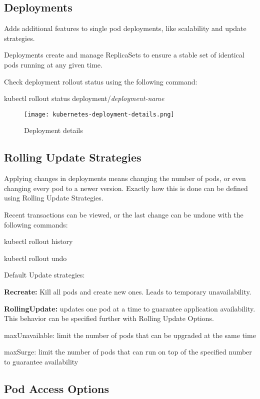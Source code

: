 \subsection{Deployments}
Adds additional features to single pod deployments, like scalability and update strategies. 

Deployments create and manage ReplicaSets to ensure a stable set of identical pods running at any given time. 

Check deployment rollout status using the following command:

\ttfamily
kubectl rollout status deployment/\emph{deployment-name}
\rmfamily

\begin{figure}[h]
    \centering
    \texttt{[image: kubernetes-deployment-details.png]}
    \caption{Deployment details}
\end{figure}

\subsection{Rolling Update Strategies}
Applying changes in deployments means changing the number of pods, or even changing every pod to a newer version. 
Exactly how this is done can be defined using Rolling Update Strategies. 

Recent transactions can be viewed, or the last change can be undone with the following commands:

\ttfamily
kubectl rollout history

kubectl rollout undo
\rmfamily

\vspace{3mm}
\noindent
Default Update strategies:

\textbf{Recreate:} Kill all pods and create new ones. Leads to temporary unavailability.

\textbf{RollingUpdate:} updates one pod at a time to guarantee application availability. This behavior can be specified further with Rolling Update Options.

maxUnavailable: limit the number of pods that can be upgraded at the same time

maxSurge: limit the number of pods that can run on top of the specified number to guarantee availability

\subsection{Pod Access Options}

